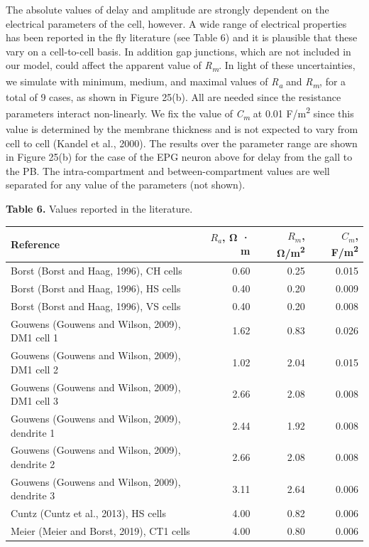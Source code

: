 \documentclass{article}
\begin{document}
The absolute values of delay and amplitude are strongly dependent on the electrical parameters of the cell, however. A wide range of electrical properties has been reported in the fly literature (see Table 6) and it is plausible that these vary on a cell-to-cell basis. In addition gap junctions, which are not included in our model, could affect the apparent value of \emph{R}\emph{\textsubscript{m}}. In light of these uncertainties, we simulate with minimum, medium, and maximal values of \emph{R}\emph{\textsubscript{a}} and \emph{R}\emph{\textsubscript{m}}, for a total of 9 cases, as shown in Figure 25(b). All are needed since the resistance parameters interact non-linearly. We fix the value of \emph{C}\emph{\textsubscript{m}} at 0.01 F/m\textsuperscript{2} since this value is determined by the membrane thickness and is not expected to vary from cell to cell (Kandel et al., 2000). The results over the parameter range are shown in Figure 25(b) for the case of the EPG neuron above for delay from the gall to the PB. The intra-compartment and between-compartment values are well separated for any value of the parameters (not shown).

\noindent \textbf{Table 6.} Values reported in the literature.
\begin{center}\footnotesize
\begin{longtable}{lrrr}
\textbf{Reference} & $R_a$, Ω · m & $R_m$, Ω/m\textsuperscript{2} & $C_m$, \textbf{F/m\textsuperscript{2}} \\
\hline
Borst (Borst and Haag, 1996), CH cells & 0.60 & 0.25 & 0.015 \\
Borst (Borst and Haag, 1996), HS cells & 0.40 & 0.20 & 0.009 \\
Borst (Borst and Haag, 1996), VS cells & 0.40 & 0.20 & 0.008 \\
Gouwens (Gouwens and Wilson, 2009), DM1 cell 1 & 1.62 & 0.83 & 0.026 \\
Gouwens (Gouwens and Wilson, 2009), DM1 cell 2 & 1.02 & 2.04 & 0.015 \\
Gouwens (Gouwens and Wilson, 2009), DM1 cell 3 & 2.66 & 2.08 & 0.008 \\
Gouwens (Gouwens and Wilson, 2009), dendrite 1 & 2.44 & 1.92 & 0.008 \\
Gouwens (Gouwens and Wilson, 2009), dendrite 2 & 2.66 & 2.08 & 0.008 \\
Gouwens (Gouwens and Wilson, 2009), dendrite 3 & 3.11 & 2.64 & 0.006 \\
Cuntz (Cuntz et al., 2013), HS cells & 4.00 & 0.82 & 0.006 \\
Meier (Meier and Borst, 2019), CT1 cells & 4.00 & 0.80 & 0.006 \\
\end{longtable}
\end{center}
\end{document}
